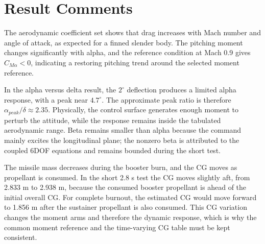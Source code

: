 \section{Result Comments}

The aerodynamic coefficient set shows that drag increases with Mach number and angle of attack, as expected for a finned slender body. The pitching moment changes significantly with alpha, and the reference condition at Mach 0.9 gives \(C_{M\alpha}<0\), indicating a restoring pitching trend around the selected moment reference.

In the alpha versus delta result, the \(2^\circ\) deflection produces a limited alpha response, with a peak near \(4.7^\circ\). The approximate peak ratio is therefore \(\alpha_{peak}/\delta \approx 2.35\). Physically, the control surface generates enough moment to perturb the attitude, while the response remains inside the tabulated aerodynamic range. Beta remains smaller than alpha because the command mainly excites the longitudinal plane; the nonzero beta is attributed to the coupled 6DOF equations and remains bounded during the short test.

The missile mass decreases during the booster burn, and the CG moves as propellant is consumed. In the short 2.8 s test the CG moves slightly aft, from 2.833 m to 2.938 m, because the consumed booster propellant is ahead of the initial overall CG. For complete burnout, the estimated CG would move forward to 1.856 m after the sustainer propellant is also consumed. This CG variation changes the moment arms and therefore the dynamic response, which is why the common moment reference and the time-varying CG table must be kept consistent.
